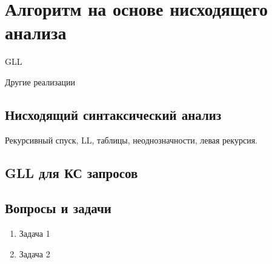 \section{Алгоритм на основе нисходящего анализа}

GLL~\cite{Grigorev:2017:CPQ:3166094.3166104}

Другие реализации~\cite{MEDEIROS201975}

\subsection{Нисходящий синтаксический анализ}

Рекурсивный спуск, LL, таблицы, неоднозначности, левая рекурсия.

\subsection{GLL для КС запросов}

\subsection{Вопросы и задачи}
\begin{enumerate}
  \item Задача 1
  \item Задача 2
\end{enumerate}
